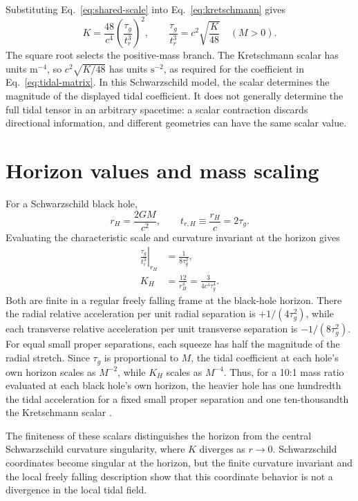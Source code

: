 \documentclass[12pt]{article}
\begin{document}
Substituting Eq.~\eqref{eq:shared-scale} into Eq.~\eqref{eq:kretschmann} gives
\begin{equation}
  K=\frac{48}{c^4}\left(\frac{\tau_g}{t_r^3}\right)^2,
  \qquad
  \frac{\tau_g}{t_r^3}=c^2\sqrt{\frac{K}{48}}
  \quad (M>0).
  \label{eq:invariant-scale}
\end{equation}
The square root selects the positive-mass branch. The Kretschmann scalar has units $\mathrm{m^{-4}}$, so $c^2\sqrt{K/48}$ has units $\mathrm{s^{-2}}$, as required for the coefficient in Eq.~\eqref{eq:tidal-matrix}. In this Schwarzschild model, the scalar determines the magnitude of the displayed tidal coefficient. It does not generally determine the full tidal tensor in an arbitrary spacetime: a scalar contraction discards directional information, and different geometries can have the same scalar value.

\section{Horizon values and mass scaling}
\label{sec:horizon}

For a Schwarzschild black hole,
\begin{equation}
  r_H=\frac{2GM}{c^2},
  \qquad
  t_{r,H}\equiv\frac{r_H}{c}=2\tau_g.
  \label{eq:horizon-radius}
\end{equation}
Evaluating the characteristic scale and curvature invariant at the horizon gives
\begin{align}
  \left.\frac{\tau_g}{t_r^3}\right|_{r_H}
    &=\frac{1}{8\tau_g^2},\\
  K_H
    &=\frac{12}{r_H^4}
     =\frac{3}{4c^4\tau_g^4}.
  \label{eq:horizon-values}
\end{align}
Both are finite in a regular freely falling frame at the black-hole horizon. There the radial relative acceleration per unit radial separation is $+1/(4\tau_g^2)$, while each transverse relative acceleration per unit transverse separation is $-1/(8\tau_g^2)$. For equal small proper separations, each squeeze has half the magnitude of the radial stretch. Since $\tau_g$ is proportional to $M$, the tidal coefficient at each hole's own horizon scales as $M^{-2}$, while $K_H$ scales as $M^{-4}$. Thus, for a 10:1 mass ratio evaluated at each black hole's own horizon, the heavier hole has one hundredth the tidal acceleration for a fixed small proper separation and one ten-thousandth the Kretschmann scalar \cite{TongGR,HamiltonGR}.

The finiteness of these scalars distinguishes the horizon from the central Schwarzschild curvature singularity, where $K$ diverges as $r\to0$. Schwarzschild coordinates become singular at the horizon, but the finite curvature invariant and the local freely falling description show that this coordinate behavior is not a divergence in the local tidal field.
\end{document}
